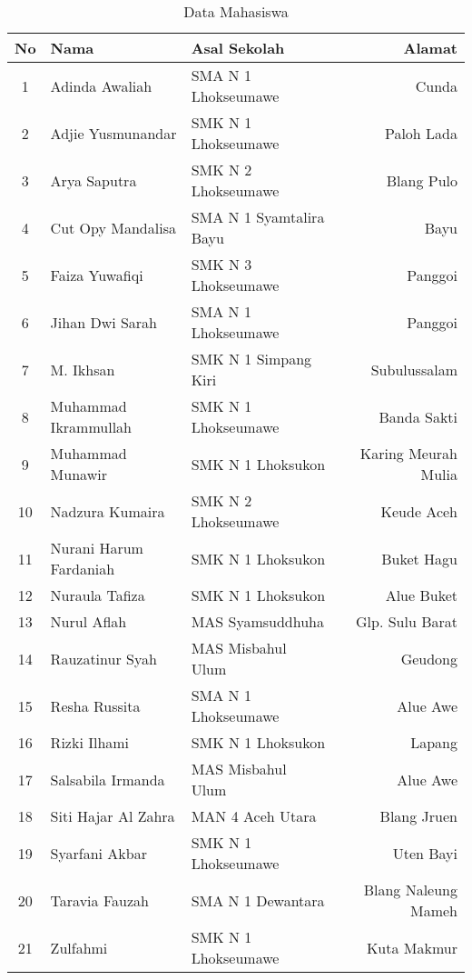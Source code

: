 \documentclass[a4paper]{tufte-handout}
\begin{document}
\begin{table}[!ht]
\vspace*{.5cm}
\caption{Data Mahasiswa}
\label{tab:perkenalan}
\centering
\begin{tabular}{cllr} 
\toprule
No & Nama 				& Asal Sekolah 				& Alamat\\
\midrule
1 	& Adinda Awaliah	& SMA N 1 Lhokseumawe 		& Cunda \\
2 	& Adjie Yusmunandar	& SMK N 1 Lhokseumawe 		& Paloh Lada \\
3 	& Arya Saputra 		& SMK N 2 Lhokseumawe 		& Blang Pulo \\
4 	& Cut Opy Mandalisa	& SMA N 1 Syamtalira Bayu	& Bayu \\
5 	& Faiza Yuwafiqi	& SMK N 3 Lhokseumawe 		& Panggoi \\
6 	& Jihan Dwi Sarah	& SMA N 1 Lhokseumawe 		& Panggoi \\
7 	& M. Ikhsan			& SMK N 1 Simpang Kiri 		& Subulussalam \\
\midrule
8 	& Muhammad Ikrammullah		& SMK N 1 Lhokseumawe 	& Banda Sakti \\
9 	& Muhammad Munawir			& SMK N 1 Lhoksukon		& Karing Meurah Mulia \\
10 	& Nadzura Kumaira			& SMK N 2 Lhokseumawe 	& Keude Aceh \\
11 	& Nurani Harum Fardaniah	& SMK N 1 Lhoksukon 	& Buket Hagu \\
12 	& Nuraula Tafiza			& SMK N 1 Lhoksukon 	& Alue Buket \\
13 	& Nurul Aflah				& MAS Syamsuddhuha		& Glp. Sulu Barat \\
14 	& Rauzatinur Syah			& MAS Misbahul Ulum 	& Geudong \\
\midrule
15 	& Resha Russita			& SMA N 1 Lhokseumawe 	& Alue Awe \\
16 	& Rizki Ilhami			& SMK N 1 Lhoksukon 	& Lapang \\
17 	& Salsabila Irmanda		& MAS Misbahul Ulum 	& Alue Awe \\
18 	& Siti Hajar Al Zahra	& MAN 4 Aceh Utara 		& Blang Jruen \\
19 	& Syarfani Akbar		& SMK N 1 Lhokseumawe 	& Uten Bayi \\
20 	& Taravia Fauzah		& SMA N 1 Dewantara 	& Blang Naleung Mameh \\
21 	& Zulfahmi				& SMK N 1 Lhokseumawe	& Kuta Makmur \\
\bottomrule
\end{tabular}
\end{table}
\end{document}

